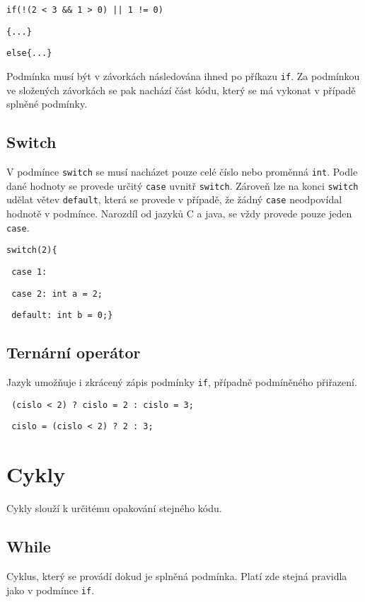 \documentclass[czech]{thesiskiv}
\begin{document}

\texttt{if(!(2 < 3 \&\& 1 > 0) || 1 != 0)} 

\texttt{\{...\}}

\texttt{else\{...\} }

\noindent Podmínka musí být v závorkách následována ihned po příkazu \texttt{if}.
Za podmínkou ve složených závorkách se pak nachází část kódu, který se má vykonat v případě splněné podmínky.

\subsection{Switch}
V podmínce \texttt{switch} se musí nacházet pouze celé číslo nebo proměnná  \texttt{int}.
Podle dané hodnoty se provede určitý \texttt{case} uvnitř \texttt{switch}.
Zároveň lze na konci \texttt{switch} udělat větev \texttt{default}, která 
se provede v případě, že žádný \texttt{case} neodpovídal hodnotě v podmínce.
Narozdíl od jazyků C a java, se vždy provede pouze jeden \texttt{case}.


\texttt{switch(2)\{}

\texttt{    case 1: }

\texttt{    case 2: int a = 2;}

\texttt{    default: int b = 0;\}}

\subsection{Ternární operátor}
Jazyk umožňuje i zkrácený zápis podmínky \texttt{if}, případně podmíněného přiřazení.


\texttt{  (cislo < 2) ? cislo = 2 : cislo = 3;}


\texttt{  cislo = (cislo < 2) ? 2 : 3;}

               
\section{Cykly}
Cykly slouží k určitému opakování stejného kódu.

\subsection{While}
Cyklus, který se provádí dokud je splněná podmínka.
Platí zde stejná pravidla jako v podmínce \texttt{if}.
\end{document}
